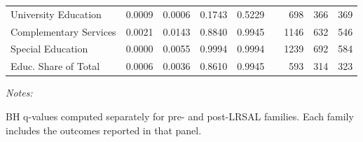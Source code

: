 \begin{table}[!h]
{\begin{threeparttable}
\begin{tabular}[t]{lrrrllrrr}
\hspace{1em}University Education & 0.0009 & 0.0006 & 0.1743 & 0.5229 &  & 698 & 366 & 369\\
\hspace{1em}Complementary Services & 0.0021 & 0.0143 & 0.8840 & 0.9945 &  & 1146 & 632 & 546\\
\hspace{1em}Special Education & 0.0000 & 0.0055 & 0.9994 & 0.9994 &  & 1239 & 692 & 584\\
\hspace{1em}Educ. Share of Total & 0.0006 & 0.0036 & 0.8610 & 0.9945 &  & 593 & 314 & 323\\
\bottomrule
\end{tabular}
\begin{tablenotes}
\item \textit{Notes:} 
\item BH q-values computed separately for pre- and post-LRSAL families. Each family includes the outcomes reported in that panel.
\end{tablenotes}
\end{threeparttable}}
\end{table}
